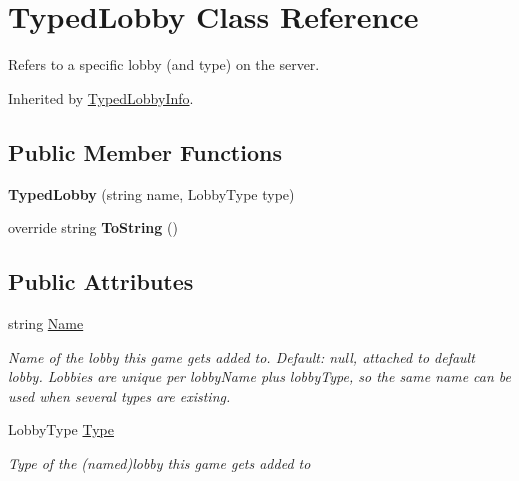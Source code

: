 \hypertarget{class_typed_lobby}{}\section{Typed\+Lobby Class Reference}
\label{class_typed_lobby}


Refers to a specific lobby (and type) on the server.  




Inherited by \hyperlink{class_typed_lobby_info}{Typed\+Lobby\+Info}.

\subsection*{Public Member Functions}
\begin{DoxyCompactItemize}
\item 
{\bfseries Typed\+Lobby} (string name, Lobby\+Type type)\hypertarget{class_typed_lobby_aa384f44e95a51cd7b7fd5cfc3354fde3}{}\label{class_typed_lobby_aa384f44e95a51cd7b7fd5cfc3354fde3}

\item 
override string {\bfseries To\+String} ()\hypertarget{class_typed_lobby_a7ba53ade2e4b461836a442872bdb5f71}{}\label{class_typed_lobby_a7ba53ade2e4b461836a442872bdb5f71}

\end{DoxyCompactItemize}
\subsection*{Public Attributes}
\begin{DoxyCompactItemize}
\item 
string \hyperlink{class_typed_lobby_acd1dfdf3ed901ee8ebe75587fcd0c60b}{Name}
\begin{DoxyCompactList}\small\item\em Name of the lobby this game gets added to. Default\+: null, attached to default lobby. Lobbies are unique per lobby\+Name plus lobby\+Type, so the same name can be used when several types are existing.\end{DoxyCompactList}\item 
Lobby\+Type \hyperlink{class_typed_lobby_a6f007dbaead56a950745524463ce5219}{Type}
\begin{DoxyCompactList}\small\item\em Type of the (named)lobby this game gets added to\end{DoxyCompactList}\end{DoxyCompactItemize}

